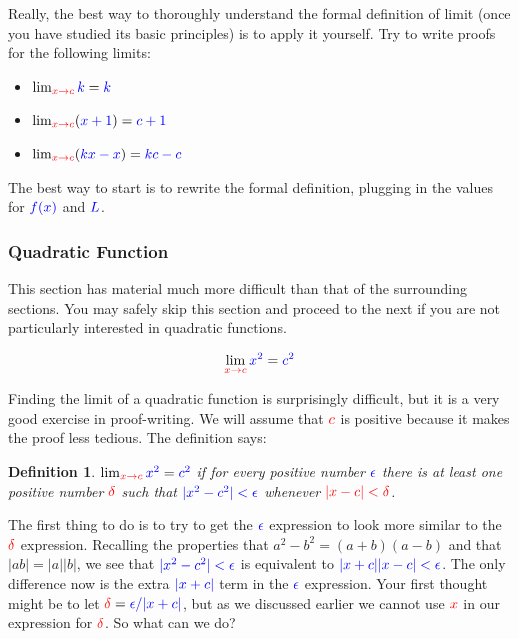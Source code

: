 \documentclass{myarticle}
\newcommand\danger{{
    \fontencoding{U}\fontfamily{futs}\selectfont\char 66\relax}}
\newcommand{\hor}[1]{\textcolor{red}{#1}}
\newcommand{\ver}[1]{\textcolor{blue}{#1}}
\theoremstyle{nospace}
\newtheorem*{oldattempt}{Definition}
\newenvironment{attempt}
{\begin{mdframed}\begin{oldattempt}}
    {\end{oldattempt}\end{mdframed}}
\newtheorem{old series theorem}{Theorem}
\newenvironment{series theorem}
{\begin{mdframed}\begin{old series theorem}}
    {\end{old series theorem}\end{mdframed}}
\begin{document}
Really, the best way to thoroughly understand the formal definition of
limit (once you have studied its basic principles) is to apply it
yourself. Try to write proofs for the following limits:

\begin{itemize}
\item $\lim_{\hor{x \to c}} \ver{k} = \ver{k}$
\item $\lim_{\hor{x \to c}} (\ver{x + 1}) = \ver{c + 1}$
\item $\lim_{\hor{x \to c}} (\ver{kx - x}) = \ver{kc - c}$
\end{itemize}

The best way to start is to rewrite the formal definition, plugging in
the values for $\ver{f(x)}$ and $\ver{L}$.

\subsubsection{Quadratic Function}
\label{sec:quadratic function}

\begin{mdframed}
  \centering
  \danger

  This section has material much more difficult than that of the
  surrounding sections. You may safely skip this section and proceed
  to the next if you are not particularly interested in quadratic
  functions.
\end{mdframed}

\[
  \lim_{\hor{x \to c}} \ver{x^2} = \ver{c^2}
\]

Finding the limit of a quadratic function is surprisingly difficult,
but it is a very good exercise in proof-writing. We will assume that
$\hor{c}$ is positive because it makes the proof less tedious. The
definition says:

\begin{attempt}
  $\lim_{\hor{x \to c}} \ver{x^2} = \ver{c^2}$ if for every positive
  number $\ver{\epsilon}$ there is at least one positive number
  $\hor{\delta}$ such that $\ver{|x^2 - c^2| < \epsilon}$ whenever
  $\hor{|x - c| < \delta}$.
\end{attempt}

The first thing to do is to try to get the $\ver{\epsilon}$ expression
to look more similar to the $\hor{\delta}$ expression. Recalling the
properties that $a^2 - b^2 = (a + b)(a - b)$ and that $|ab| = |a||b|$,
we see that $\ver{|x^2 - c^2| < \epsilon}$ is equivalent to
$\ver{|x + c||x - c| < \epsilon}$. The only difference now is the
extra $\ver{|x + c|}$ term in the $\ver{\epsilon}$ expression. Your
first thought might be to let $\hor{\delta} = \ver{\epsilon/|x + c|}$,
but as we discussed earlier we cannot use $\hor{x}$ in our expression
for $\hor{\delta}$. So what can we do?
\end{document}
